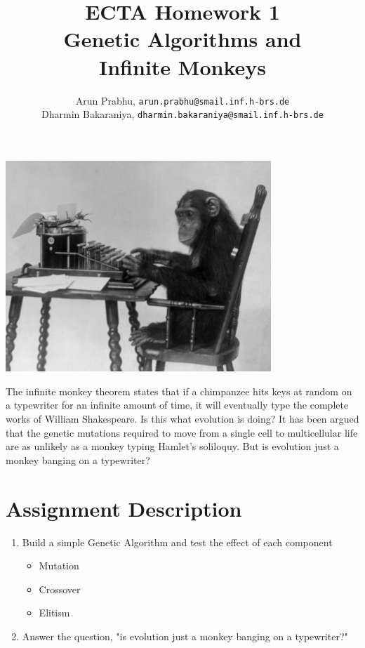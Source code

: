 \documentclass{article}
\title{ECTA Homework 1\\Genetic Algorithms and\\Infinite Monkeys}
\author{\color{blue}Arun Prabhu, \texttt{arun.prabhu@smail.inf.h-brs.de}\\
\color{blue}Dharmin Bakaraniya, \texttt{dharmin.bakaraniya@smail.inf.h-brs.de}}
\begin{document}
\maketitle

\begin{center}
\begin{minipage}{1\linewidth}
	\begin{center}
    \includegraphics[width=0.75\textwidth]{img/chimp}  
    \end{center}
    
	{\large The infinite monkey theorem states that if a chimpanzee hits keys at random on a typewriter for an infinite amount of time, it will eventually type the complete works of William Shakespeare. Is this what evolution is doing? It has been argued that the genetic mutations required to move from a single cell to multicellular life are as unlikely as a monkey typing Hamlet's soliloquy. But is evolution just a monkey banging on a typewriter?}	
\end{minipage}
\end{center}

\section{Assignment Description}
	\begin{enumerate}
		\item Build a simple Genetic Algorithm and test the effect of each component
		\begin{itemize}
			\item Mutation
			\item Crossover
			\item Elitism		
		\end{itemize}
		\item Answer the question, "is evolution just a monkey banging on a typewriter?"	
	\end{enumerate}
\end{document}
